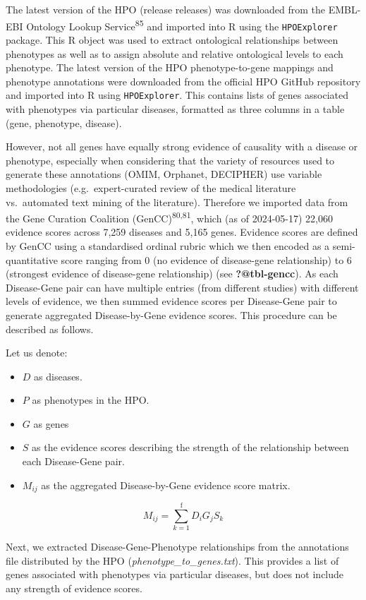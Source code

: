 \documentclass[
]{report}
\begin{document}
The latest version of the HPO (release releases) was downloaded from the
EMBL-EBI Ontology Lookup Service\textsuperscript{85} and imported into R
using the \texttt{HPOExplorer} package. This R object was used to
extract ontological relationships between phenotypes as well as to
assign absolute and relative ontological levels to each phenotype. The
latest version of the HPO phenotype-to-gene mappings and phenotype
annotations were downloaded from the official HPO GitHub repository and
imported into R using \texttt{HPOExplorer}. This contains lists of genes
associated with phenotypes via particular diseases, formatted as three
columns in a table (gene, phenotype, disease).

However, not all genes have equally strong evidence of causality with a
disease or phenotype, especially when considering that the variety of
resources used to generate these annotations (OMIM, Orphanet, DECIPHER)
use variable methodologies (e.g.~expert-curated review of the medical
literature vs.~automated text mining of the literature). Therefore we
imported data from the Gene Curation Coalition
(GenCC)\textsuperscript{80,81}, which (as of 2024-05-17) 22,060 evidence
scores across 7,259 diseases and 5,165 genes. Evidence scores are
defined by GenCC using a standardised ordinal rubric which we then
encoded as a semi-quantitative score ranging from 0 (no evidence of
disease-gene relationship) to 6 (strongest evidence of disease-gene
relationship) (see \textbf{?@tbl-gencc}). As each Disease-Gene pair can
have multiple entries (from different studies) with different levels of
evidence, we then summed evidence scores per Disease-Gene pair to
generate aggregated Disease-by-Gene evidence scores. This procedure can
be described as follows.

Let us denote:

\begin{itemize}
\item
  \(D\) as diseases.
\item
  \(P\) as phenotypes in the HPO.
\item
  \(G\) as genes
\item
  \(S\) as the evidence scores describing the strength of the
  relationship between each Disease-Gene pair.
\item
  \(M_{ij}\) as the aggregated Disease-by-Gene evidence score matrix.
\end{itemize}

\[
M_{ij} = \sum_{k=1}^{\text{f}} D_i G_j S_k
\]

Next, we extracted Disease-Gene-Phenotype relationships from the
annotations file distributed by the HPO
(\emph{phenotype\_to\_genes.txt}). This provides a list of genes
associated with phenotypes via particular diseases, but does not include
any strength of evidence scores.
\end{document}
